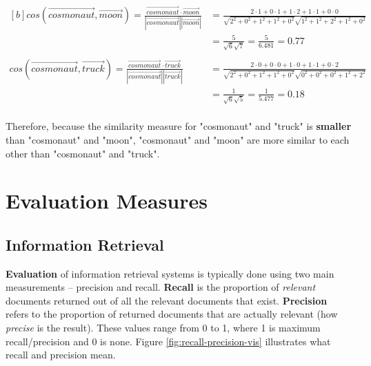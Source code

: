 \documentclass{article}
\begin{document}
\begin{equation}
\begin{aligned}[b]
	cos(\vec{cosmonaut}, \vec{moon}) = 
	\frac{\vec{cosmonaut} \cdot \vec{moon}}{|\vec{cosmonaut}| |\vec{moon}|}
	&= \frac{2 \cdot 1 + 0 \cdot 1 + 1 \cdot 2 + 1 \cdot 1 + 0 \cdot 0}{ \sqrt{2^2 + 0^2 + 1^2 + 1^2 + 0^2} \sqrt{1^2 + 1^2 + 2^2 + 1^2 + 0^2} } \\
	&= \frac{5}{\sqrt{6}\sqrt{7}} = \frac{5}{6.481} = 0.77 \\
	\\
	cos(\vec{cosmonaut}, \vec{truck}) = 
	\frac{\vec{cosmonaut} \cdot \vec{truck}}{|\vec{cosmonaut}| |\vec{truck}|}
	&= \frac{2 \cdot 0 + 0 \cdot 0 + 1 \cdot 0 + 1 \cdot 1 + 0 \cdot 2}{ \sqrt{2^2 + 0^2 + 1^2 + 1^2 + 0^2} \sqrt{0^2 + 0^2 + 0^2 + 1^2 + 2^2} } \\
	&= \frac{1}{\sqrt{6}\sqrt{5}} = \frac{1}{5.477} = 0.18 \\
	\label{eq:similarity-measure-example}
\end{aligned}
\end{equation}

Therefore, because the similarity measure for "cosmonaut" and "truck" is \textbf{smaller} than "cosmonaut" and "moon", "cosmonaut" and "moon" are more similar to each other than "cosmonaut" and "truck". 

\section{Evaluation Measures}

\subsection{Information Retrieval}
\label{sec:ir-evaluation}

\textbf{Evaluation} of information retrieval systems is typically done using two main measurements -- precision and recall. \textbf{Recall} is the proportion of \textit{relevant} documents returned out of all the relevant documents that exist. \textbf{Precision} refers to the proportion of returned documents that are actually relevant (how \textit{precise} is the result). These values range from 0 to 1, where 1 is maximum recall/precision and 0 is none. Figure \ref{fig:recall-precision-vis} illustrates what recall and precision mean.
\end{document}
